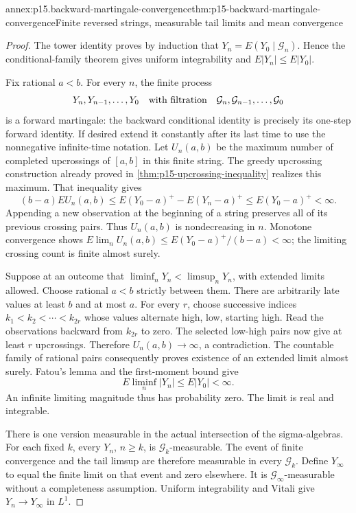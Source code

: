 \begin{annexitem}{annex:p15.backward-martingale-convergence}{thm:p15-backward-martingale-convergence}{Finite reversed strings, measurable tail limits and mean convergence}
\begin{proof}
The tower identity proves by induction that
\(Y_n=E(Y_0\mid\mathcal G_n)\). Hence the conditional-family theorem
gives uniform integrability and \(E|Y_n|\leq E|Y_0|\).

Fix rational \(a<b\). For every \(n\), the finite process
\[
               Y_n,Y_{n-1},\ldots,Y_0
       \quad\hbox{with filtration}\quad
               \mathcal G_n,\mathcal G_{n-1},\ldots,\mathcal G_0
\]
is a forward martingale: the backward conditional identity is precisely
its one-step forward identity. If desired extend it constantly after
its last time to use the nonnegative infinite-time notation.
Let \(U_n(a,b)\) be the maximum number of completed upcrossings
of \([a,b]\) in this finite string.
The greedy upcrossing construction already proved in
\cref{thm:p15-upcrossing-inequality} realizes this maximum.
That inequality gives
\[
       (b-a)EU_n(a,b)
             \leq E(Y_0-a)^+-E(Y_n-a)^+
             \leq E(Y_0-a)^+<\infty.
\]
Appending a new observation at the beginning of a string preserves all
of its previous crossing pairs. Thus \(U_n(a,b)\) is nondecreasing in \(n\).
Monotone convergence shows
\(E\lim_n U_n(a,b)\leq E(Y_0-a)^+/(b-a)<\infty\);
the limiting crossing count is finite almost surely.

Suppose at an outcome that
\(\liminf_nY_n<\limsup_nY_n\), with extended limits allowed.
Choose rational \(a<b\) strictly between them.
There are arbitrarily late values at least \(b\) and at most \(a\).
For every \(r\), choose successive indices
\(k_1<k_2<\cdots<k_{2r}\) whose values alternate high, low,
starting high. Read the observations backward from \(k_{2r}\)
to zero. The selected low-high pairs now give at least \(r\)
upcrossings. Therefore \(U_n(a,b)\to\infty\), a contradiction.
The countable family of rational pairs consequently proves existence
of an extended limit almost surely.
Fatou's lemma and the first-moment bound give
\[
                        E\liminf_n|Y_n|\leq E|Y_0|<\infty.
\]
An infinite limiting magnitude thus has probability zero.
The limit is real and integrable.

There is one version measurable in the actual intersection of the
sigma-algebras. For each fixed \(k\), every \(Y_n\), \(n\geq k\),
is \(\mathcal G_k\)-measurable. The event of finite convergence and
the tail limsup are therefore measurable in every \(\mathcal G_k\).
Define \(Y_\infty\) to equal the finite limit on that event and zero
elsewhere. It is \(\mathcal G_\infty\)-measurable without a completeness
assumption. Uniform integrability and Vitali give \(Y_n\to Y_\infty\)
in \(L^1\).


\end{proof}
\end{annexitem}
